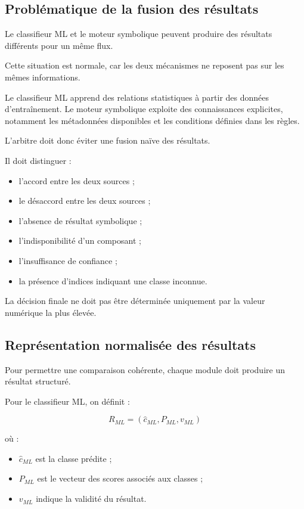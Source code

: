 \subsection{Problématique de la fusion des résultats}

Le classifieur ML et le moteur symbolique peuvent produire des résultats différents pour un même flux.

Cette situation est normale, car les deux mécanismes ne reposent pas sur les mêmes informations.

Le classifieur ML apprend des relations statistiques à partir des données d'entraînement. Le moteur symbolique exploite des connaissances explicites, notamment les métadonnées disponibles et les conditions définies dans les règles.

L'arbitre doit donc éviter une fusion naïve des résultats.

Il doit distinguer :

\begin{itemize}
    \item l'accord entre les deux sources ;
    \item le désaccord entre les deux sources ;
    \item l'absence de résultat symbolique ;
    \item l'indisponibilité d'un composant ;
    \item l'insuffisance de confiance ;
    \item la présence d'indices indiquant une classe inconnue.
\end{itemize}

La décision finale ne doit pas être déterminée uniquement par la valeur numérique la plus élevée.

\subsection{Représentation normalisée des résultats}

Pour permettre une comparaison cohérente, chaque module doit produire un résultat structuré.

Pour le classifieur ML, on définit :

\[
R_{ML}=(\hat{c}_{ML},P_{ML},v_{ML})
\]

où :

\begin{itemize}
    \item $\hat{c}_{ML}$ est la classe prédite ;
    \item $P_{ML}$ est le vecteur des scores associés aux classes ;
    \item $v_{ML}$ indique la validité du résultat.
\end{itemize}

